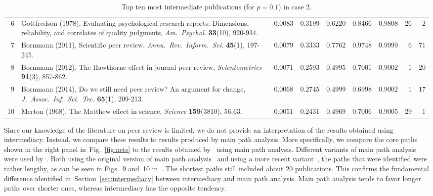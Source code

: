 \documentclass{article}
\theoremstyle{definition}
\newcommand{\secref}[1]{Section~\ref{sec:#1}\xspace}
\newcommand{\figref}[1]{Fig.~\ref{fig:#1}\xspace}
\begin{document}
\begin{table}
\begin{tabular}{rp{14cm}rrrrrrr}
    $6$ & Gottfredson (1978), Evaluating psychological research reports: Dimensions, reliability, and correlates of quality judgments, {\it Am.\ Psychol.} {\bf 33}(10), 920-934. & $0.0083$ & $0.3199$ & $0.6220$ & $0.8466$ & $0.9808$ & $26$ & $2$ \\
    $7$ & Bornmann (2011), Scientific peer review, {\it Annu.\ Rev.\ Inform.\ Sci.} {\bf 45}(1), 197-245. & $0.0079$ & $0.3333$ & $0.7762$ & $0.9748$ & $0.9999$ & $6$ & $71$ \\
    $8$ & Bornmann (2012), The Hawthorne effect in journal peer review, {\it Scientometrics} {\bf 91}(3), 857-862. & $0.0071$ & $0.2593$ & $0.4995$ & $0.7001$ & $0.9002$ & $1$ & $20$ \\
    $9$ & Bornmann (2014), Do we still need peer review? An argument for change, {\it J.\ Assoc.\ Inf.\ Sci.\ Tec.} {\bf 65}(1), 209-213. & $0.0068$ & $0.2745$ & $0.4999$ & $0.6998$ & $0.9002$ & $1$ & $17$ \\
    $10$ & Merton (1968), The Matthew effect in science, {\it Science} {\bf 159}(3810), 56-63. & $0.0051$ & $0.2431$ & $0.4969$ & $0.7006$ & $0.9005$ & $29$ & $1$ \\\bottomrule
  \end{tabular}
  \caption{Top ten most intermediate publications (for $p = 0.1$) in case 2.}
  \label{tbl:pr}
\end{table}

Since our knowledge of the literature on peer review is limited, we do not provide an interpretation of the results obtained using intermediacy. Instead, we compare these results to results produced by main path analysis. More specifically, we compare the core paths shown in the right panel in~\figref{nets} to the results obtained by~\citet{Batagelj2017} using main path analysis. Different variants of main path analysis were used by~\citet{Batagelj2017}. Both using the original version of main path analysis~\cite{Hummon1989} and using a more recent variant~\cite{Liu2012}, the paths that were identified were rather lengthy, as can be seen in Figs.~9 and~10 in~\citet{Batagelj2017}. The shortest paths still included about $20$ publications. This confirms the fundamental difference identified in~\secref{intermediacy} between intermediacy and main path analysis. Main path analysis tends to favor longer paths over shorter ones, whereas intermediacy has the opposite tendency.

%
%
\end{document}
